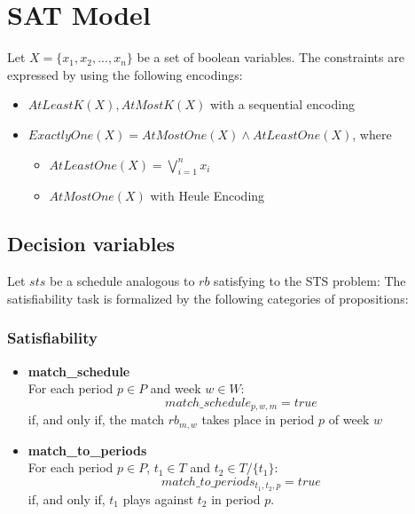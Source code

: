 \section{SAT Model}
Let $X = \{x_1, x_2, ..., x_n\}$ be a set of boolean variables.
The constraints are expressed by using the following encodings: 
\begin{itemize}
    \item $AtLeastK(X), AtMostK(X)$ with a sequential encoding
    \item $ExactlyOne(X) = AtMostOne(X) \land AtLeastOne(X)$, where
    \begin{itemize}
        \item $AtLeastOne(X)=\bigvee_{i=1}^{n} x_i$
        \item $AtMostOne(X)$ with Heule Encoding
    \end{itemize}

\end{itemize}
\subsection{Decision variables}
Let $sts$ be a schedule analogous to $rb$ satisfying to the STS problem:
The satisfiability task is formalized by the following categories of propositions:

\subsubsection{Satisfiability}
\begin{itemize}
    \item \textbf{match\_schedule}\\
        For each period $p \in P$ and week $w \in W$:
        $$
        match\_schedule_{p, w, m} = true
        $$
        if, and only if, the match $rb_{m, w}$ takes place in period $p$ of week $w$
    \item \textbf{match\_to\_periods}\\
        For each period $p \in P$, $t_1 \in T$ and $t_2 \in T/\{t_1\}$:
        $$
        match\_to\_periods_{t_1, t_2, p} = true
        $$
        if, and only if, $t_1$ plays against $t_2$ in period $p$.
\end{itemize}
